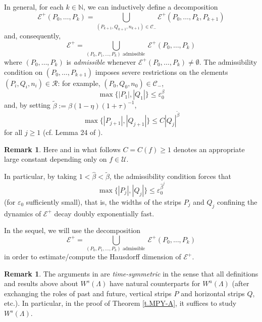 \documentclass[12pt]{amsart}
\numberwithin{equation}{section}
\theoremstyle{definition}
\newtheorem{remark}[theorem]{Remark}
\newcommand{\<}{{\langle}}
\renewcommand{\>}{{\rangle}}
\begin{document}
In general, for each $k\in\mathbb{N}$, we can inductively define a decomposition
$$\mathcal{E}^+(P_0,\dots, P_k)=\bigcup\limits_{(P_{k+1}, Q_{k+1}, n_{k+1})\in\mathcal{C}_-} \mathcal{E}^+(P_0,\dots, P_k, P_{k+1})$$
and, consequently, 
$$\mathcal{E}^+=\bigcup\limits_{(P_0, P_1, \dots, P_k) \textrm{ admissible }}\mathcal{E}^+(P_0,\dots, P_k)$$
where $(P_0,\dots,P_k)$ is \emph{admissible} whenever $\mathcal{E}^+(P_0,\dots, P_k)\neq\emptyset$. The admissibility condition on $(P_0,\dots,P_{k+1})$ imposes severe restrictions on the elements $(P_i, Q_i, n_i)\in\mathcal{R}$: for example, $(P_0,Q_0,n_0)\in\mathcal{C}_-$, 
\begin{equation}\label{e.11.64}
\max\{|P_1|, |Q_1|\}\leq \varepsilon_0^{\beta}
\end{equation}
and, by setting $\widetilde{\beta}:=\beta(1-\eta)(1+\tau)^{-1}$,  
\begin{equation}\label{e.Lemma24}
\max\{|P_{j+1}|, |Q_{j+1}|\}\leq C|Q_j|^{\widetilde{\beta}}
\end{equation}
for all $j\geq 1$ (cf. Lemma 24 of \cite{PY09}). 
\begin{remark} Here and in what follows $C=C(f)\geq 1$ denotes an appropriate large constant depending only on $f\in\mathcal{U}$.
\end{remark}
In particular, by taking $1<\widehat{\beta}<\widetilde{\beta}$, the admissibility condition forces that 
\begin{equation}\label{e.Lemma24'}
\max\{|P_j|,|Q_j|\}\leq\varepsilon_0^{\widehat{\beta}^j}
\end{equation} 
(for $\varepsilon_0$ sufficiently small), that is, the widths of the strips $P_j$ and $Q_j$ confining the dynamics of $\mathcal{E}^+$ decay doubly exponentially fast. 

In the sequel, we will use the decomposition 
$$\mathcal{E}^+=\bigcup\limits_{(P_0, P_1, \dots, P_k) \textrm{ admissible }}\mathcal{E}^+(P_0,\dots, P_k)$$ 
in order to estimate/compute the Hausdorff dimension of $\mathcal{E}^+$. 

\begin{remark}\label{r.time-symmetric} The arguments in \cite{PY09} are \emph{time-symmetric} in the sense that all definitions and results above about $W^s(\Lambda)$ have natural counterparts for $W^u(\Lambda)$ (after exchanging the roles of past and future, vertical strips $P$ and horizontal strips $Q$, etc.). In particular, in the proof of Theorem \ref{t.MPY-A}, it suffices to study $W^s(\Lambda)$.
\end{remark}
\end{document}
